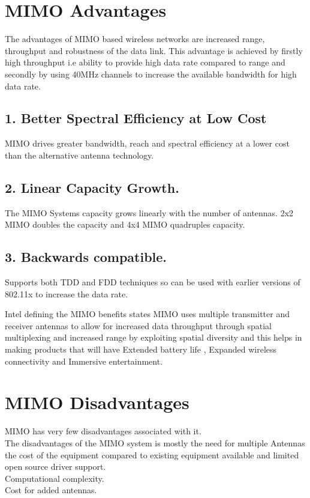 \documentclass[12pt]{report}
\begin{document}
    
    \section*{MIMO Advantages}
    The advantages of MIMO based wireless networks are increased range,
throughput and robustness of the data link. This advantage is achieved
by firstly high throughput i.e ability to provide high data rate compared
to range and secondly by using 40MHz channels to increase the available
bandwidth for high data rate.

 \subsection*{1. Better Spectral Efficiency at Low Cost}
 MIMO drives greater bandwidth, reach and spectral efficiency at a lower
cost than the alternative antenna technology.

\subsection*{2. Linear Capacity Growth.}
The MIMO Systems capacity grows linearly with the number of antennas. 2x2 MIMO doubles the capacity and 4x4 MIMO quadruples
capacity.

 \subsection*{3. Backwards compatible.}
Supports both TDD and FDD techniques so can be used with earlier
versions of 802.11x to increase the data rate.

Intel defining the MIMO benefits states MIMO uses multiple transmitter and receiver antennas to allow for increased data throughput
through spatial multiplexing and increased range by exploiting spatial
diversity and this helps in making products that will have Extended
battery life , Expanded wireless connectivity and Immersive entertainment.
\section*{MIMO Disadvantages}
MIMO has very few disadvantages associated with it.\\
The disadvantages of the MIMO system is mostly the need for multiple Antennas the cost of the equipment compared to existing equipment available and limited open source driver support.\\
Computational complexity.\\
Cost for added antennas.\\
\end{document}
